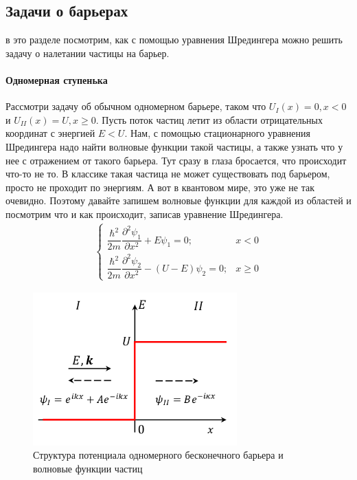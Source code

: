 \documentclass[12pt]{article}
\begin{document}
\subsection{Задачи о барьерах}
в это разделе посмотрим, как с помощью уравнения Шредингера можно решить задачу о налетании частицы на барьер. 
\paragraph{Одномерная ступенька}
Рассмотри задачу об обычном одномерном барьере, таком что $U_I(x) = 0, x<0$ и $U_{II}(x) = U, x \ge 0$. Пусть поток частиц летит из области отрицательных координат с энергией $E<U$. Нам, с помощью стационарного уравнения Шредингера надо найти волновые функции такой частицы, а также узнать что у нее с отражением от такого барьера. Тут сразу в глаза бросается, что происходит что-то не то. В классике такая частица не может существовать под барьером, просто не проходит по энергиям. А вот в квантовом мире, это уже не так очевидно. Поэтому давайте запишем волновые функции для каждой из областей и посмотрим что и как происходит, записав уравнение Шредингера.
\begin{gather*}
    \begin{cases}
         \dfrac{\hbar^2}{2m}\dfrac{\partial^2\psi_1}{\partial x^2} +  E\psi_1=0; &x<0  \\[10pt]
         \dfrac{\hbar^2}{2m}\dfrac{\partial^2\psi_2}{\partial x^2} - (U - E)\psi_2=0; &x \ge 0
    \end{cases}
\end{gather*}
\begin{figure}[h]
    \centering
    \includegraphics[width=0.7\textwidth,height=\textheight,keepaspectratio]{Seminar_04/pics/pic_01.pdf}
    \caption{Структура потенциала одномерного бесконечного барьера и волновые функции частиц}
    \label{fig:sem_04}
\end{figure}
\end{document}
